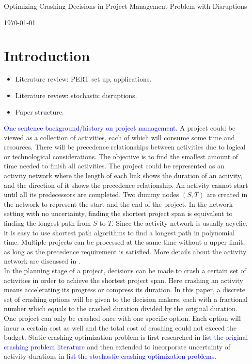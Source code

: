 \documentclass[11pt]{article}
\newcommand{\ms}{\medskip}
\begin{document}
\baselineskip0.25in

\begin{center}
\begin{large}
\begin{bf}

Optimizing Crashing Decisions in Project Management Problem with Disruptions \ms

\today \ms
\end{bf}
\end{large}
\end{center}

\section{Introduction} \label{sec:intro}
	\begin{itemize}
		\item Literature review: PERT set up, applications.
		\item Literature review: stochastic disruptions.
		\item Paper structure.
	\end{itemize}
	\textcolor{blue}{One sentence background/history on project management.} A project could be viewed as a collection of activities, each of which will consume some time and resources. There will be precedence relationships between activities due to logical or technological considerations. The objective is to find the smallest amount of time needed to finish all activities. The project could be represented as an activity network where the length of each link shows the duration of an activity, and the direction of it shows the precedence relationship. An activity cannot start until all its predecessors are completed. Two dummy nodes \((S,T)\) are created in the network to represent the start and the end of the project. In the network setting with no uncertainty, finding the shortest project span is equivalent to finding the longest path from \(S\) to \(T\). Since the activity network is usually acyclic, it is easy to use shortest path algorithms to find a longest path in polynomial time. Multiple projects can be processed at the same time without a upper limit, as long as the precedence requirement is satisfied. More details about the activity network are discussed in \cite{Elmaghraby77}.\\
	\newline 
	In the planning stage of a project, decisions can be made to crash a certain set of activities in order to achieve the shortest project span. Here crashing an activity means accelerating its progress or compress its duration. In this paper, a discrete set of crashing options will be given to the decision makers, each with a fractional number which equals to the crashed duration divided by the original duration. One project can only be crashed once with one specific option. Each option will incur a certain cost as well and the total cost of crashing could not exceed the budget. Static crashing optimization problem is first researched in \textcolor{blue}{list the original crashing problem literature} and then extended to incorporate uncertainty of activity durations in \textcolor{blue}{list the stochastic crashing optimization problems.}\\
\end{document}
